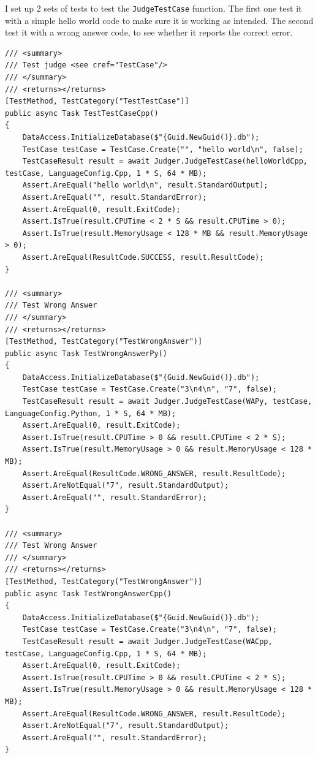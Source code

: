 \documentclass[a4paper]{report}
\newcommand{\code}{\texttt}
\begin{document}
I set up 2 sets of tests to test the \code{JudgeTestCase} function. The first one test it with a simple hello world code to make sure it is working as intended. The second test it with a wrong answer code, to see whether it reports the correct error.

\begin{verbatim}
/// <summary>
/// Test judge <see cref="TestCase"/>
/// </summary>
/// <returns></returns>
[TestMethod, TestCategory("TestTestCase")]
public async Task TestTestCaseCpp()
{
    DataAccess.InitializeDatabase($"{Guid.NewGuid()}.db");
    TestCase testCase = TestCase.Create("", "hello world\n", false);
    TestCaseResult result = await Judger.JudgeTestCase(helloWorldCpp, testCase, LanguageConfig.Cpp, 1 * S, 64 * MB);
    Assert.AreEqual("hello world\n", result.StandardOutput);
    Assert.AreEqual("", result.StandardError);
    Assert.AreEqual(0, result.ExitCode);
    Assert.IsTrue(result.CPUTime < 2 * S && result.CPUTime > 0);
    Assert.IsTrue(result.MemoryUsage < 128 * MB && result.MemoryUsage > 0);
    Assert.AreEqual(ResultCode.SUCCESS, result.ResultCode);
}

/// <summary>
/// Test Wrong Answer
/// </summary>
/// <returns></returns>
[TestMethod, TestCategory("TestWrongAnswer")]
public async Task TestWrongAnswerPy()
{
    DataAccess.InitializeDatabase($"{Guid.NewGuid()}.db");
    TestCase testCase = TestCase.Create("3\n4\n", "7", false);
    TestCaseResult result = await Judger.JudgeTestCase(WAPy, testCase, LanguageConfig.Python, 1 * S, 64 * MB);
    Assert.AreEqual(0, result.ExitCode);
    Assert.IsTrue(result.CPUTime > 0 && result.CPUTime < 2 * S);
    Assert.IsTrue(result.MemoryUsage > 0 && result.MemoryUsage < 128 * MB);
    Assert.AreEqual(ResultCode.WRONG_ANSWER, result.ResultCode);
    Assert.AreNotEqual("7", result.StandardOutput);
    Assert.AreEqual("", result.StandardError);
}

/// <summary>
/// Test Wrong Answer
/// </summary>
/// <returns></returns>
[TestMethod, TestCategory("TestWrongAnswer")]
public async Task TestWrongAnswerCpp()
{
    DataAccess.InitializeDatabase($"{Guid.NewGuid()}.db");
    TestCase testCase = TestCase.Create("3\n4\n", "7", false);
    TestCaseResult result = await Judger.JudgeTestCase(WACpp, testCase, LanguageConfig.Cpp, 1 * S, 64 * MB);
    Assert.AreEqual(0, result.ExitCode);
    Assert.IsTrue(result.CPUTime > 0 && result.CPUTime < 2 * S);
    Assert.IsTrue(result.MemoryUsage > 0 && result.MemoryUsage < 128 * MB);
    Assert.AreEqual(ResultCode.WRONG_ANSWER, result.ResultCode);
    Assert.AreNotEqual("7", result.StandardOutput);
    Assert.AreEqual("", result.StandardError);
}
\end{verbatim}
\end{document}

